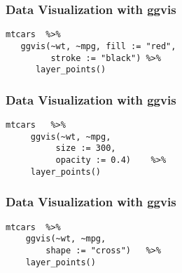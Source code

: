 \documentclass[MASTER.tex]{subfiles}
\begin{document}
\begin{frame}[fragile]
	\frametitle{Data Visualization with ggvis}
	\Large
	
\begin{framed}
	\begin{verbatim}
mtcars  %>% 
   ggvis(~wt, ~mpg, fill := "red", 
         stroke := "black") %>% 
      layer_points()
\end{verbatim}
\end{framed}

\end{frame}

\begin{frame}[fragile]
	\frametitle{Data Visualization with ggvis}
	\Large
	
\begin{framed}
	\begin{verbatim}
mtcars   %>% 
     ggvis(~wt, ~mpg, 
          size := 300, 
          opacity := 0.4)    %>% 
     layer_points()
\end{verbatim}
\end{framed}

\end{frame}

\begin{frame}[fragile]
	\frametitle{Data Visualization with ggvis}	
	\Large
	
\begin{framed}
	\begin{verbatim}
mtcars  %>% 
    ggvis(~wt, ~mpg, 
        shape := "cross")   %>% 
    layer_points()
\end{verbatim}
\end{framed}

\end{frame}
\end{document}

